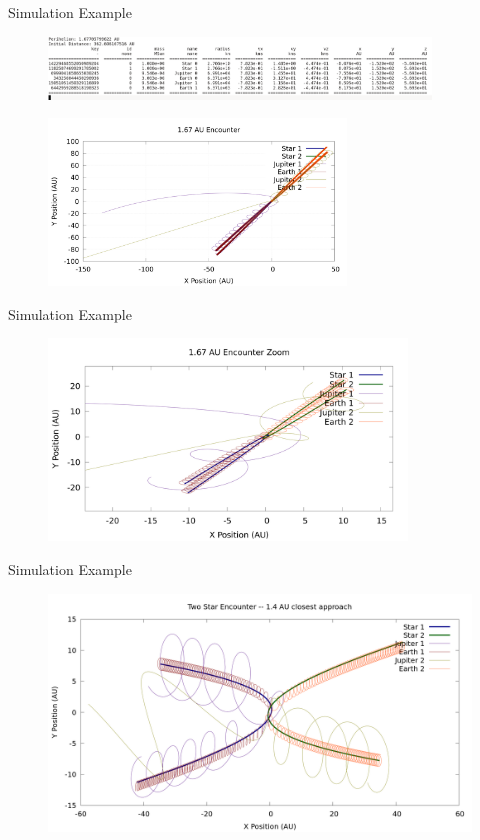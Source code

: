 \documentclass{beamer}
\begin{document}
\begin{frame}{Simulation Example}
    \begin{figure}
        \centering
        \includegraphics[width=4.00in]{Params.png}
    \end{figure}
    \begin{figure}
        \centering
        \includegraphics[height=1.75in]{ejection.png}
    \end{figure}
\end{frame}

\begin{frame}{Simulation Example}
    \begin{figure}
        \centering
        \includegraphics[width=3.75in]{1_67_AU_zoom}
    \end{figure}
\end{frame}

\begin{frame}{Simulation Example}
    \begin{figure}
        \centering
        \includegraphics[height=2.5in]{1.4AU/1_4_AU_encounter_plot}
    \end{figure}
\end{frame}
\end{document}
